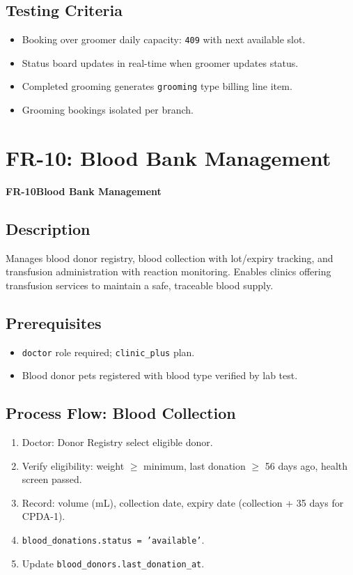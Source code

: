 \documentclass[12pt,a4paper]{report}
\newcommand{\testcheck}{\textcolor{successgreen}{\ding{51}}}
\newcommand{\moduleheader}[2]{%
  \par\vspace{6pt}%
  \noindent\colorbox{branddark}{\color{white}\textbf{\small #1}}\quad\textbf{\large #2}%
  \par\vspace{4pt}%
}
\begin{document}
\section{Testing Criteria}

\begin{itemize}
  \item[\testcheck] Booking over groomer daily capacity: \texttt{409} with next available slot.
  \item[\testcheck] Status board updates in real-time when groomer updates status.
  \item[\testcheck] Completed grooming generates \texttt{grooming} type billing line item.
  \item[\testcheck] Grooming bookings isolated per branch.
\end{itemize}

\chapter{FR-10: Blood Bank Management}

\moduleheader{FR-10}{Blood Bank Management}

\section{Description}

Manages blood donor registry, blood collection with lot/expiry tracking, and transfusion administration with reaction monitoring. Enables clinics offering transfusion services to maintain a safe, traceable blood supply.

\section{Prerequisites}

\begin{itemize}
  \item \texttt{doctor} role required; \texttt{clinic\_plus} plan.
  \item Blood donor pets registered with blood type verified by lab test.
\end{itemize}

\section{Process Flow: Blood Collection}

\begin{enumerate}
  \item Doctor: Donor Registry \textrightarrow{} select eligible donor.
  \item Verify eligibility: weight $\geq$ minimum, last donation $\geq$ 56 days ago, health screen passed.
  \item Record: volume (mL), collection date, expiry date (collection + 35 days for CPDA-1).
  \item \texttt{blood\_donations.status = 'available'}.
  \item Update \texttt{blood\_donors.last\_donation\_at}.
\end{enumerate}
\end{document}
